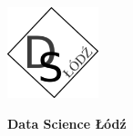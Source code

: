\documentclass[\main/boa.tex]{subfiles}
\begin{document}
	
	\begin{minipage}[t]{0.915\textwidth}
		\center     
		\includegraphics[width=100px]{img/logos.bw/ds_lodz.png} 
	\end{minipage}
	
	\Large \textbf {Data Science Łódź}
	
	
	\vskip 0.3cm
	\normalsize 
\vskip 1.5cm
\end{document}
